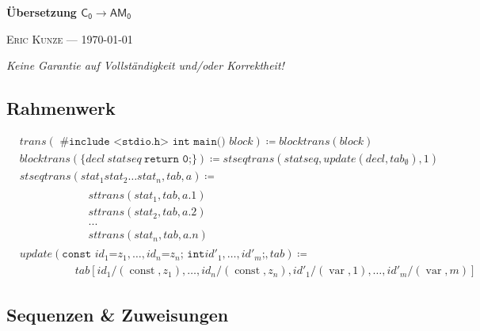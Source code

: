 \documentclass[ngerman,a4paper, 12pt, fleqn]{article}
\newcommand*\ruleline[1]{\par\noindent\raisebox{.8ex}{\makebox[\linewidth]{\hrulefill\hspace{1ex}\raisebox{-.8ex}{#1}\hspace{1ex}\hrulefill}}}
\newcommand{\defeq}{\coloneqq}
\begin{document}
	\begin{center}
		{\bfseries \sffamily \LARGE Übersetzung $\mathsf{C_0 \to AM_0}$}
		
		\ruleline{\sffamily \large Übungsblatt 10}
		
		{\scshape Eric Kunze --- \today}
	\end{center}
	\medskip
	
	{ \footnotesize \doclicenseThis }
	
	\begin{center}
		\small \slshape Keine Garantie auf Vollständigkeit und/oder Korrektheit!
	\end{center}

	\bigskip
	
	\subsection*{Rahmenwerk}
	\begin{align*}
		&trans (\texttt{ \#\. include <stdio.h> int main() } block ) \defeq blocktrans(block) \\
		&blocktrans(\texttt{\{} decl \ statseq \ \texttt{return 0;}\texttt{\}}) \defeq stseqtrans(statseq, update(decl , tab_\emptyset ), 1) \\
		&stseqtrans(stat_1 stat_2 \dots stat_n , tab, a) \defeq \\[-3pt]
		&\hspace{5em}\begin{aligned}
			&sttrans(stat_1 , tab, a.1) \\[-3pt]
			&sttrans(stat_2 , tab, a.2) \\[-3pt]
			&... \\[-3pt]
			&sttrans(stat_n , tab, a.n)
		\end{aligned} \\
		&update( \texttt{const } id_1 \texttt{=} z_1 , \dots , id_n \texttt{=} z_n \texttt{; } \texttt{int} id'_1 , \dots , id'_m \texttt{;} , tab) \defeq \\[-3pt]
		&\hspace{5em}
		tab[id_1 / (\operatorname{const}, z_1 ), \dots , id_n /(\operatorname{const}, z_n), id'_1 /(\operatorname{var}, 1), \dots , id'_m /(\operatorname{var}, m)]	
	\end{align*}

	\subsection*{Sequenzen \& Zuweisungen}
	
\end{document}
